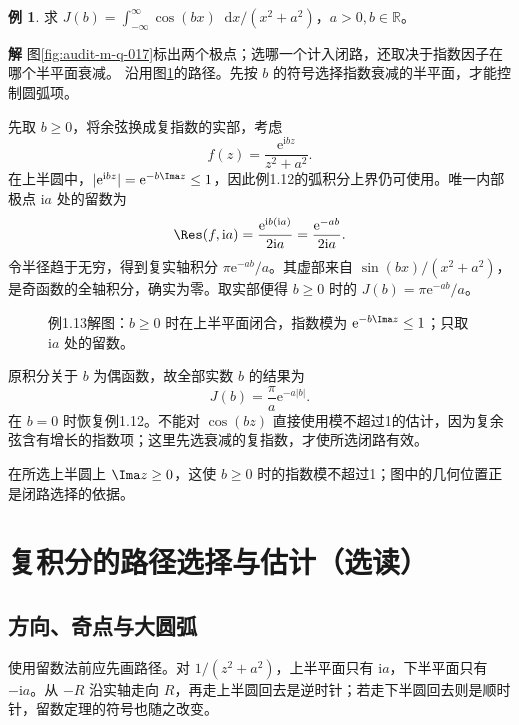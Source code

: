 \documentclass[11pt,openany,fontset=fandol]{ctexbook}
\theoremstyle{plain}\newtheorem{theorem}{定理}[chapter]\newtheorem{proposition}[theorem]{命题}
\theoremstyle{definition}\newtheorem{definition}{定义}[chapter]\newtheorem{example}{例}[chapter]
\theoremstyle{remark}\newtheorem*{remark}{说明}
\newcommand{\SolutionStart}{\par\nobreak\medskip\nobreak\noindent\textbf{解}\quad\ignorespaces}
\newenvironment{solution}{\SolutionStart}{\par\medskip}
\newcommand{\dd}{\mathop{}\!\mathrm d}\newcommand{\ii}{\mathrm i}\newcommand{\ee}{\mathrm e}
\begin{document}
\begin{example}
求 $J(b)=\int_{-\infty}^{\infty}\cos(bx)\dd x/(x^2+a^2)$，$a>0,b\in\mathbb R$。
\end{example}

\begin{solution}
图\ref{fig:audit-m-q-017}标出两个极点；选哪一个计入闭路，还取决于指数因子在哪个半平面衰减。
沿用图\ref{fig:eg-1-13}的路径。先按 $b$ 的符号选择指数衰减的半平面，才能控制圆弧项。

先取 $b\ge0$，将余弦换成复指数的实部，考虑
\[
f(z)=\frac{\ee^{\ii bz}}{z^2+a^2}.
\]
在上半圆中，$|\ee^{\ii bz}|=\ee^{-b\Ima z}\le1$，因此例1.12的弧积分上界仍可使用。唯一内部极点 $\ii a$ 处的留数为
\[
\Res(f,\ii a)=\frac{\ee^{\ii b(\ii a)}}{2\ii a}
=\frac{\ee^{-ab}}{2\ii a}.
\]
令半径趋于无穷，得到复实轴积分 $\pi\ee^{-ab}/a$。其虚部来自 $\sin(bx)/(x^2+a^2)$，是奇函数的全轴积分，确实为零。取实部便得 $b\ge0$ 时的 $J(b)=\pi\ee^{-ab}/a$。

\begin{figure}[H]\centering
{}
\caption{例1.13解图：$b\ge0$ 时在上半平面闭合，指数模为 $\ee^{-b\Ima z}\le1$；只取 $\ii a$ 处的留数。}
\label{fig:eg-1-13}
\end{figure}

原积分关于 $b$ 为偶函数，故全部实数 $b$ 的结果为
\[
J(b)=\frac\pi a\ee^{-a|b|}.
\]
在 $b=0$ 时恢复例1.12。不能对 $\cos(bz)$ 直接使用模不超过1的估计，因为复余弦含有增长的指数项；这里先选衰减的复指数，才使所选闭路有效。

在所选上半圆上 $\Ima z\ge0$，这使 $b\ge0$ 时的指数模不超过1；图中的几何位置正是闭路选择的依据。
\end{solution}

\section{复积分的路径选择与估计（选读）}
\subsection{方向、奇点与大圆弧}
使用留数法前应先画路径。对 $1/(z^2+a^2)$，上半平面只有 $\ii a$，下半平面只有 $-\ii a$。从 $-R$ 沿实轴走向 $R$，再走上半圆回去是逆时针；若走下半圆回去则是顺时针，留数定理的符号也随之改变。
\end{document}

